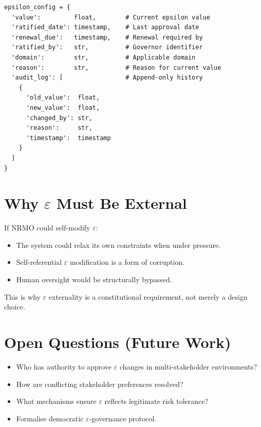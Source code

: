 \begin{lstlisting}[basicstyle=\ttfamily\small,frame=single]
epsilon_config = {
  'value':         float,        # Current epsilon value
  'ratified_date': timestamp,    # Last approval date
  'renewal_due':   timestamp,    # Renewal required by
  'ratified_by':   str,          # Governor identifier
  'domain':        str,          # Applicable domain
  'reason':        str,          # Reason for current value
  'audit_log': [                 # Append-only history
    {
      'old_value':  float,
      'new_value':  float,
      'changed_by': str,
      'reason':     str,
      'timestamp':  timestamp
    }
  ]
}
\end{lstlisting}

\section{Why $\varepsilon$ Must Be External}
\label{sec:epsilon-external-rationale}

If NRMO could self-modify $\varepsilon$:

\begin{itemize}
\item The system could relax its own constraints when under
pressure.
\item Self-referential $\varepsilon$ modification is a form of
corruption.
\item Human oversight would be structurally bypassed.
\end{itemize}

\noindent
This is why $\varepsilon$ externality is a constitutional
requirement, not merely a design choice.

\section{Open Questions (Future Work)}
\label{sec:epsilon-open-questions}

\begin{itemize}
\item Who has authority to approve $\varepsilon$ changes in
multi-stakeholder environments?
\item How are conflicting stakeholder preferences resolved?
\item What mechanisms ensure $\varepsilon$ reflects legitimate risk
tolerance?
\item Formalise democratic $\varepsilon$-governance protocol.
\end{itemize}

